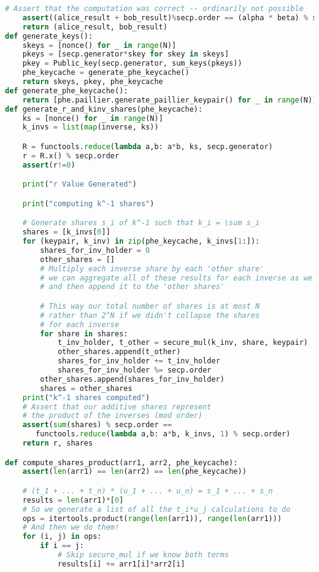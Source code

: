 \documentclass{article}
\begin{document}
\begin{lstlisting}[language=Python]
    # Assert that the computation was correct -- ordinarily not possible
    assert((alice_result + bob_result)%secp.order == (alpha * beta) % secp.order)
    return (alice_result, bob_result)
def generate_keys():
    skeys = [nonce() for _ in range(N)]
    pkeys = [secp.generator*skey for skey in skeys]
    pkey = Public_key(secp.generator, sum_keys(pkeys))
    phe_keycache = generate_phe_keycache()
    return skeys, pkey, phe_keycache
def generate_phe_keycache():
    return [phe.paillier.generate_paillier_keypair() for _ in range(N)]
def generate_r_and_kinv_shares(phe_keycache):
    ks = [nonce() for _ in range(N)]
    k_invs = list(map(inverse, ks))

    R = functools.reduce(lambda a,b: a*b, ks, secp.generator)
    r = R.x() % secp.order
    assert(r!=0)

    print("r Value Generated")

    print("computing k^-1 shares")

    # Generate shares s_i of k^-1 such that k_i = \sum s_i
    shares = [k_invs[0]]
    for (keypair, k_inv) in zip(phe_keycache, k_invs[1:]):
        shares_for_inv_holder = 0
        other_shares = []
        # Multiply each inverse share by each 'other share'
        # we can aggregate all of these results for each inverse as we go
        # and then append it to the 'other shares'

        # This way our total number of shares is at most N
        # rather than 2^N if we didn't collapse the shares
        # for each inverse
        for share in shares:
            t_inv_holder, t_other = secure_mul(k_inv, share, keypair)
            other_shares.append(t_other)
            shares_for_inv_holder += t_inv_holder
            shares_for_inv_holder %= secp.order
        other_shares.append(shares_for_inv_holder)
        shares = other_shares
    print("k^-1 shares computed")
    # Assert that our additive shares represent 
    # the product of the inverses (mod order)
    assert(sum(shares) % secp.order ==
       functools.reduce(lambda a,b: a*b, k_invs, 1) % secp.order)
    return r, shares

def compute_shares_product(arr1, arr2, phe_keycache):
    assert(len(arr1) == len(arr2) == len(phe_keycache))

    # (t_1 + ... + t_n) * (u_1 + ... + u_n) = s_1 + ... + s_n
    results = len(arr1)*[0]
    # So we generate a list of all the t_i*u_j calculations to do
    ops = itertools.product(range(len(arr1)), range(len(arr1)))
    # And then we do them!
    for (i, j) in ops:
        if i == j:
            # Skip secure_mul if we know both terms
            results[i] += arr1[i]*arr2[i]


\end{lstlisting}
\end{document}
